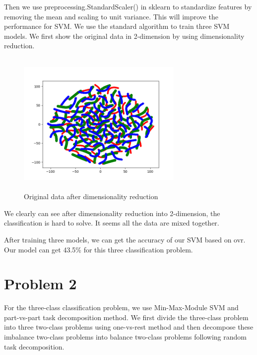 \documentclass[12pt,onecolumn]{IEEEtran}
\begin{document}
Then we use preprocessing.StandardScaler() in sklearn to standardize features by removing the mean and scaling to unit variance. This will improve the performance for SVM. We use the standard algorithm to train three SVM models. We first show the original data in 2-dimension by using dimensionality reduction.
\begin{figure}[H]
	\centering
	\includegraphics[width=8cm,height=7cm]{originalData.png}
	\caption{Original data after dimensionality reduction}
\end{figure}

We clearly can see after dimensionality reduction into 2-dimension, the classification is hard to solve. It seems all the data are mixed together.

After training three models, we can get the accuracy of our SVM based on ovr. Our model can get 43.5\% for this three classification problem. 

\section{Problem 2}
For the three-class classification problem, we use Min-Max-Module SVM and part-vs-part task decomposition method. We first divide the three-class problem into three two-class problems using one-vs-rest method and then decompose these imbalance two-class problems into balance two-class problems following random task decomposition.
 
\end{document}
